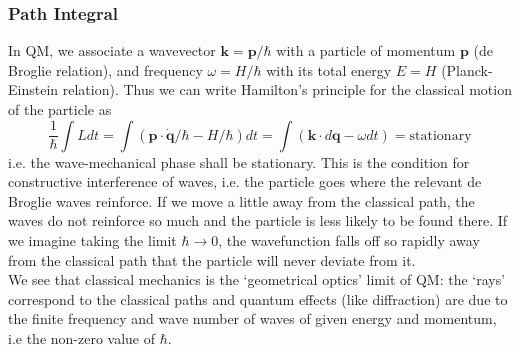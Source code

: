 \documentclass[a4paper]{article}
\theoremstyle{new}
\begin{document}
\subsubsection*{Path Integral}
In QM, we associate a wavevector $\mathbf{k} = \mathbf{p}/\hbar$ with a particle of momentum $\mathbf{p}$ (de Broglie relation), and frequency $\omega=H/\hbar$ with its total energy $E = H$ (Planck-Einstein relation). Thus we can write Hamilton’s principle for the classical motion of the particle as
$$\frac{1}{\hbar}\int Ldt=\int(\mathbf{p}\cdot\mathbf{\dot{q}}/\hbar-H/\hbar)dt=\int(\mathbf{k}\cdot d\mathbf{q}-\omega dt)=\text{stationary}$$
i.e. the wave-mechanical phase shall be stationary. This is the condition for constructive interference of waves, i.e. the particle goes where the relevant de Broglie waves reinforce. If we move a little away from the classical path, the waves do not reinforce so much and the particle is less likely to be found there. If we imagine taking the limit $\hbar\rightarrow0$, the wavefunction falls off so rapidly away from the classical path that the particle will never deviate from it.\\[5pt]
We see that classical mechanics is the `geometrical optics' limit of QM: the `rays' correspond to the classical paths and quantum effects (like diffraction) are due to the finite frequency and wave number of waves of given energy and momentum, i.e the non-zero value of $\hbar$.
\end{document}
